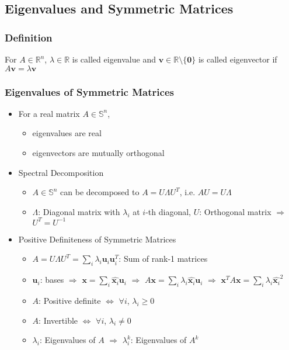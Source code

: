 \subsection{Eigenvalues and Symmetric Matrices}

\subsubsection*{Definition}
For $A \in \mathbb{R}^n$, $\lambda \in \mathbb{R}$ is called eigenvalue and
$\mathbf{v} \in \mathbb{R}\setminus\{\mathbf{0}\}$ is called eigenvector if $ A\mathbf{v} = \lambda\mathbf{v} $

\subsubsection*{Eigenvalues of Symmetric Matrices}
\begin{itemize}
    \item For a real matrix $A \in \mathbb{S}^n$,
    \begin{itemize}
        \item eigenvalues are real
        \item eigenvectors are mutually orthogonal
    \end{itemize}
    \item Spectral Decomposition
    \begin{itemize}
        \item $A \in \mathbb{S}^n$ can be decomposed to $A = U\Lambda U^T$, i.e. $AU = U\Lambda$
        \item $\Lambda$: Diagonal matrix with $\lambda_i$ at $i$-th diagonal,
            $U$: Orthogonal matrix $\Rightarrow$ $U^T = U^{-1}$
    \end{itemize}
    \item Positive Definiteness of Symmetric Matrices
    \begin{itemize}
        \item $A = U\Lambda U^T = \sum_i \lambda_i \mathbf{u}_i \mathbf{u}_i^T$: Sum of rank-1 matrices
        \item $\mathbf{u}_i$: bases $\Rightarrow$ $\mathbf{x} = \sum_{i} \hat{\mathbf{x}_i}\mathbf{u}_i$
            $\Rightarrow$ $A\mathbf{x} = \sum_{i} \lambda_i \hat{\mathbf{x}_i}\mathbf{u}_i$
            $\Rightarrow$ $\mathbf{x}^TA\mathbf{x} = \sum_{i} \lambda_i \hat{\mathbf{x}_i}^2$
        \item $A$: Positive definite $\Leftrightarrow$ $\forall i$, $\lambda_i \geq 0$
        \item $A$: Invertible $\Leftrightarrow$ $\forall i$, $\lambda_i \neq 0$
        \item $\lambda_i$: Eigenvalues of $A$ $\Rightarrow$ $\lambda_i^k$: Eigenvalues of $A^k$
    \end{itemize}
\end{itemize}


